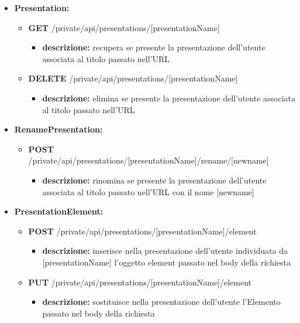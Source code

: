 {{\begin{itemize}
			
		\item \textbf{Presentation:}
			\begin{itemize}
			\item  \textbf{GET} /private/api/presentations/[presentationName]
				\begin{itemize} 
				\item \textbf{descrizione:} recupera se presente la presentazione dell'utente associata al titolo passato nell'URL
				\end{itemize}
				
			\item  \textbf{DELETE} /private/api/presentations/[presentationName]
				\begin{itemize} 
				\item \textbf{descrizione:} elimina se presente la presentazione dell'utente associata al titolo passato nell'URL
				\end{itemize}
			\end{itemize}

		\item \textbf{RenamePresentation:}
			\begin{itemize}
			\item  \textbf{POST} /private/api/presentations/[presentationName]/rename/[newname] 
				\begin{itemize} 
				\item \textbf{descrizione:} rinomina se presente la presentazione dell'utente associata al titolo passato nell'URL con il nome [newname]
				\end{itemize}
			\end{itemize}
			
		\item \textbf{PresentationElement:}
			\begin{itemize}
			\item   \textbf{POST} /private/api/presentations/[presentationName]/element
				\begin{itemize} 
				\item \textbf{descrizione:} inserisce nella presentazione dell'utente individuata da [presentationName] l'oggetto element passato nel body della richiesta
				\end{itemize}
				
			\item  \textbf{PUT} /private/api/presentations/[presentationName]/element
				\begin{itemize} 
				\item \textbf{descrizione:} sostituisce nella presentazione dell'utente l'Elemento passato nel body della richiesta
				\end{itemize}
			\end{itemize}
				

\end{itemize}}}
